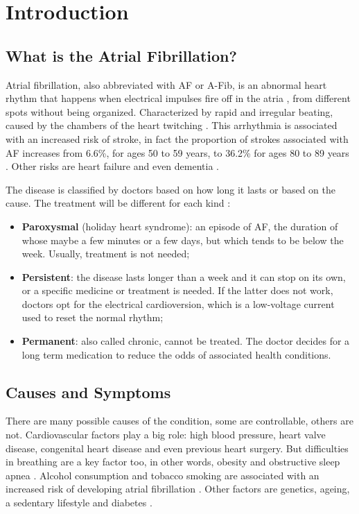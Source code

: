 \chapter{Introduction}
\label{sec:introduction}

\section{What is the Atrial Fibrillation?}
Atrial fibrillation, also abbreviated with AF or A-Fib, is an abnormal heart rhythm that happens when electrical impulses fire off in the atria , from different spots without being organized. Characterized by rapid and irregular beating, caused by the chambers of the heart twitching \cite{cdcgov17}. This arrhythmia is associated with an increased risk of stroke, in fact the proportion of strokes associated with AF increases from 6.6\%, for ages 50 to 59 years, to 36.2\% for ages 80 to 89 years \cite{10.1001/archinte.1987.00370090041008}. Other risks are heart failure and even dementia \cite{Munger2014}.


The disease is classified by doctors based on how long it lasts or based on the cause. The treatment will be different for each kind \cite{webmd2018}:
\begin{itemize}
  \item \textbf{Paroxysmal} (holiday heart syndrome): an episode of AF, the duration of whose maybe a few minutes or a few days, but which tends to be below the week. Usually, treatment is not needed;
  \item \textbf{Persistent}: the disease lasts longer than a week and it can stop on its own, or a specific medicine or treatment is needed. If the latter does not work, doctors opt for the electrical cardioversion, which is a low-voltage current used to reset the normal rhythm;
  \item \textbf{Permanent}: also called chronic, cannot be treated. The doctor decides for a long term medication to reduce the odds of associated health conditions.
\end{itemize}

\section{Causes and Symptoms}
There are many possible causes of the condition, some are controllable, others are not. Cardiovascular factors play a big role: high blood pressure, heart valve disease, congenital heart disease and even previous heart surgery. But difficulties in breathing are a key factor too, in other words, obesity and obstructive sleep apnea \cite{doi:10.1111/obr.12056}. Alcohol consumption and tobacco smoking are associated with an increased risk of developing atrial fibrillation \cite{Tonelo2013, DU20171968}. Other factors are genetics, ageing, a sedentary lifestyle and diabetes \cite{10.1001/jama.291.23.2851, Staerk2017}.

